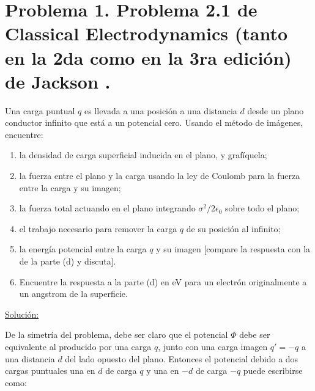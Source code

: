 \documentclass[a4paper,11pt]{article}
\numberwithin{equation}{section}
\renewcommand{\thefootnote}{\fnsymbol{footnote}}
\begin{document}

\fancyhead[R]{\thepage}

\setcounter{footnote}{0}
\renewcommand*{\thefootnote}{\arabic{footnote}}

\section{Problema 1. Problema 2.1 de Classical Electrodynamics (tanto en la 2da 
como en la 3ra edición) de Jackson \cite{jackson2,jackson3}.}

Una carga puntual $q$ es llevada a una posición a una distancia $d$ desde un 
plano conductor infinito que está a un potencial cero. Usando el método de imágenes, 
encuentre: 

\begin{enumerate}[label=\textbf{(\alph*)}]
 \item la densidad de carga superficial inducida en el plano, y grafíquela;
 \item la fuerza entre el plano y la carga usando la ley de Coulomb para la fuerza 
 entre la carga y su imagen;
 \item la fuerza total actuando en el plano integrando $\sigma^2/2\epsilon_0$ 
 sobre todo el plano;
 \item el trabajo necesario para remover la carga $q$ de su posición al infinito;
 \item la energía potencial entre la carga $q$ y su imagen [compare la respuesta 
 con la de la parte (d) y discuta].
 \item Encuentre la respuesta a la parte (d) en eV para un electrón originalmente 
 a un angstrom de la superficie.
\end{enumerate}

\vspace{.3cm}

\underline{Solución:} \vspace{.3cm}

De la simetría del problema, debe ser claro que el potencial $\Phi$ debe ser equivalente 
al producido por una carga $q$, junto con una carga imagen $q' = -q$ a una distancia 
$d$ del lado opuesto del plano. Entonces el potencial debido a dos cargas puntuales 
una en $d$ de carga $q$ y una en $-d$ de carga $-q$ puede escribirse como:
\end{document}
